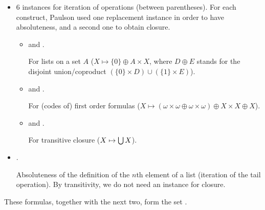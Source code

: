 \begin{itemize}
\item 6 instances for iteration of operations (between parentheses). For each construct,
  Paulson used one replacement instance in order to have absoluteness,
  and a second one to obtain closure.
  \begin{itemize}
  \item
     and 
    .
    
    For lists on a set $A$ ($X\mapsto \{0 \} \oplus A \times X$, where
    $D\oplus E$ stands for the disjoint union/coproduct $(\{0 \}\times
    D) \cup (\{1 \}\times E)$).
  \item
     and
    .
    
    For (codes of) first order formulas ($X\mapsto (\omega \times
    \omega \oplus \omega \times \omega) \oplus X \times X \oplus X$).
  \item
     and 
    .

    For transitive closure ($X\mapsto\mathop{\textstyle\bigcup} X$).
  \end{itemize}
\item {}.

  Absoluteness of the definition of the
  $n$th element of a list (iteration of the tail operation).
  By transitivity, we do not need an instance for closure.
\end{itemize}
These formulas, together with the next two, form the set
.
